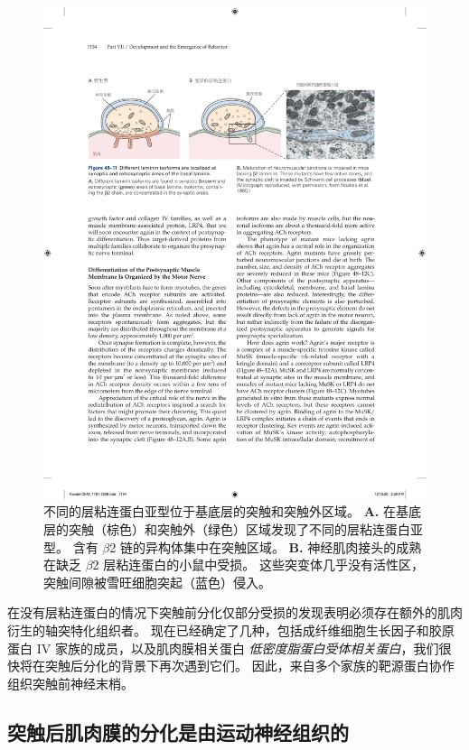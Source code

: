 \begin{figure}[htbp]
	\centering
	\includegraphics[width=1.0\linewidth]{chap48/fig_48_11}
	\caption{不同的层粘连蛋白亚型位于基底层的突触和突触外区域。
		\textbf{A.} 在基底层的突触（棕色）和突触外（绿色）区域发现了不同的层粘连蛋白亚型。
		含有 $\beta$2 链的异构体集中在突触区域。 
		\textbf{B.} 神经肌肉接头的成熟在缺乏 $\beta$2 层粘连蛋白的小鼠中受损。
		这些突变体几乎没有活性区，突触间隙被雪旺细胞突起（蓝色）侵入\cite{noakes1995aberrant}。}
	\label{fig:48_11}
\end{figure}


在没有层粘连蛋白的情况下突触前分化仅部分受损的发现表明必须存在额外的肌肉衍生的轴突特化组织者。
现在已经确定了几种，包括成纤维细胞生长因子和胶原蛋白 IV 家族的成员，以及肌肉膜相关蛋白 \textit{低密度脂蛋白受体相关蛋白}，我们很快将在突触后分化的背景下再次遇到它们。
因此，来自多个家族的靶源蛋白协作组织突触前神经末梢。



\subsection{突触后肌肉膜的分化是由运动神经组织的}

